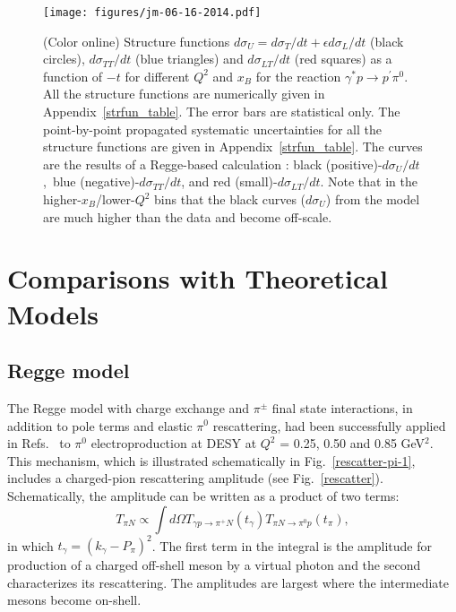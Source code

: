 \documentclass[prc,floatfix,twocolumn,superscriptaddress,letter]{revtex4}
\begin{document}
\begin{figure*}
\begin{center}
\texttt{[image: figures/jm-06-16-2014.pdf]}
\caption{
(Color online) Structure functions $d\sigma_U = d\sigma_T/dt+\epsilon d\sigma_L/dt $ (black circles), $ d\sigma_{TT}/dt$ (blue triangles)
and $d\sigma_{LT}/dt$ (red squares) as a function of $-t$ for different  $Q^2$ and $x_B$ for the reaction $\gamma^* p \to p^\prime \pi^0$.  All the structure functions are numerically given in Appendix~\ref{strfun_table}. 
The error bars are statistical only. The point-by-point propagated systematic uncertainties for all the structure functions are given  in Appendix~\ref{strfun_table}. The curves are the results of a Regge-based calculation \cite{Laget}: black (positive)-$d\sigma_U/dt $,\  blue (negative)-$d\sigma_{TT}/dt$,  and  red (small)-$d\sigma_{LT}/dt$. Note that  in the higher-$x_B$/lower-$Q^2$ bins that the black curves ($d\sigma_U$) from the model are much higher than the data and become off-scale.}
\label{fig:structure_functions}
\end{center}
\end{figure*}
\section{Comparisons with Theoretical Models}
\subsection{Regge model}


The Regge model with  charge exchange and  $\pi^\pm$ final state interactions, in addition to pole terms and elastic $\pi^0$  rescattering,  had been successfully applied in Refs.~\cite{Laget-2006,Laget-2010}  to  $\pi^0$ electroproduction at DESY  at  $Q^2$ = 0.25, 0.50 and 0.85  GeV$^2$. This mechanism, which is illustrated schematically in Fig.~\ref{rescatter-pi-1}, includes a charged-pion rescattering amplitude (see Fig.~\ref{rescatter}). Schematically, the amplitude can be written as a product of two terms: 
$$T_{\pi N} \propto \int d\Omega T_{\gamma p \to \pi^+N}(t_\gamma ) T_{\pi N \to \pi^0p}(t_\pi),$$
\noindent in which $t_\gamma = \left( k_\gamma - P_\pi \right)^2$.  The first term in the integral is the amplitude for production of a charged off-shell meson by a virtual photon and the second characterizes its rescattering. The amplitudes are largest where the intermediate mesons become on-shell. 
\end{document}
